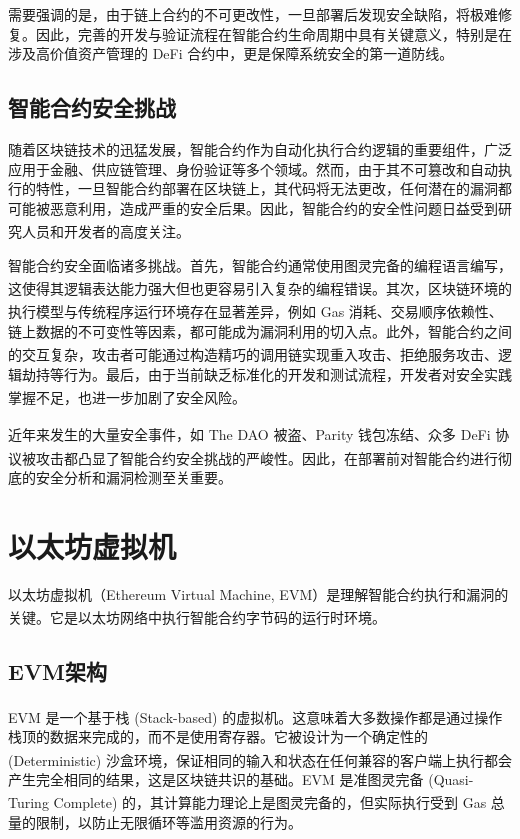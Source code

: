 \documentclass[print, master, vlined, timesmath]{DissertUESTC}
\begin{document}
需要强调的是，由于链上合约的不可更改性，一旦部署后发现安全缺陷，将极难修复。因此，完善的开发与验证流程在智能合约生命周期中具有关键意义，特别是在涉及高价值资产管理的 DeFi 合约中，更是保障系统安全的第一道防线。

\subsection{智能合约安全挑战}

随着区块链技术的迅猛发展，智能合约作为自动化执行合约逻辑的重要组件，广泛应用于金融、供应链管理、身份验证等多个领域。然而，由于其不可篡改和自动执行的特性，一旦智能合约部署在区块链上，其代码将无法更改，任何潜在的漏洞都可能被恶意利用，造成严重的安全后果。因此，智能合约的安全性问题日益受到研究人员和开发者的高度关注\textsuperscript{\cite{...}}。

智能合约安全面临诸多挑战。首先，智能合约通常使用图灵完备的编程语言编写，这使得其逻辑表达能力强大但也更容易引入复杂的编程错误\textsuperscript{\cite{...}}。其次，区块链环境的执行模型与传统程序运行环境存在显著差异，例如 Gas 消耗\textsuperscript{\cite{...}}、交易顺序依赖性\textsuperscript{\cite{...}}、链上数据的不可变性等因素，都可能成为漏洞利用的切入点。此外，智能合约之间的交互复杂，攻击者可能通过构造精巧的调用链实现重入攻击\textsuperscript{\cite{...}}、拒绝服务攻击\textsuperscript{\cite{...}}、逻辑劫持等行为。最后，由于当前缺乏标准化的开发和测试流程，开发者对安全实践掌握不足，也进一步加剧了安全风险\textsuperscript{\cite{...}}。

近年来发生的大量安全事件，如 The DAO 被盗\textsuperscript{\cite{...}}、Parity 钱包冻结\textsuperscript{\cite{...}}、众多 DeFi 协议被攻击\textsuperscript{\cite{...}}都凸显了智能合约安全挑战的严峻性。因此，在部署前对智能合约进行彻底的安全分析和漏洞检测至关重要。

\section{以太坊虚拟机}
以太坊虚拟机（Ethereum Virtual Machine, EVM）是理解智能合约执行和漏洞的关键。它是以太坊网络中执行智能合约字节码的运行时环境\textsuperscript{\cite{...}}。

\subsection{EVM架构}

EVM 是一个基于栈 (Stack-based) 的虚拟机\textsuperscript{\cite{...}}。这意味着大多数操作都是通过操作栈顶的数据来完成的，而不是使用寄存器。它被设计为一个确定性的 (Deterministic) 沙盒环境\textsuperscript{\cite{...}}，保证相同的输入和状态在任何兼容的客户端上执行都会产生完全相同的结果，这是区块链共识的基础。EVM 是准图灵完备 (Quasi-Turing Complete) 的\textsuperscript{\cite{...}}，其计算能力理论上是图灵完备的，但实际执行受到 Gas 总量的限制，以防止无限循环等滥用资源的行为。
\end{document}
